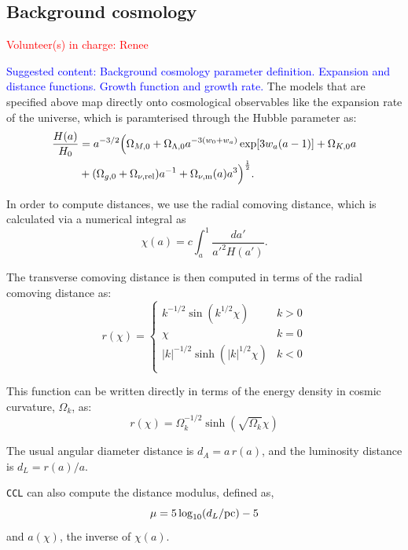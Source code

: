 \documentclass[\docopts]{\docclass}
\newcommand{\vol}[1]{\textcolor{red}{Volunteer(s) in charge: #1}}
\newcommand{\cont}[1]{\textcolor{blue}{Suggested content: #1}}
\newcommand{\ccl}{{\tt CCL}\xspace}
\begin{document}
\subsection{Background cosmology}
\vol{Renee}

\cont{Background cosmology parameter definition. Expansion and distance functions. Growth function and growth rate.}
The models that are specified above map directly onto cosmological observables like the expansion rate of the universe, which is paramterised through the Hubble parameter as:
\begin{align}\label{eq:Ha}
\frac{H(a)}{H_0} &= a^{-3/2}\Big(\Omega_{M,0}+\Omega_{\Lambda,0} a^{-3(w_0+w_a)}
    \exp[3 w_a (a-1)]+\Omega_{K,0} a \nonumber \\ &+(\Omega_{g,0} + \Omega_{\nu, {\rm rel}}) a^{-1} + \Omega_{\nu, {\rm m}}(a)a^3\Big)^{\frac{1}{2}}.
\end{align}

In order to compute distances, we use the radial comoving distance, which is calculated via a numerical integral as
\begin{equation}
 \chi(a)= c \int_a^1 \frac{da'}{a'^2 H(a')}.
\end{equation}

The transverse comoving distance is then computed in terms of the radial comoving distance as:
\begin{equation}\label{eq:angdist}
 r(\chi)=\left\{\begin{array}{cc}
                 k^{-1/2}\sin(k^{1/2}\chi) & k>0\\
                 \chi & k=0\\
                 |k|^{-1/2}\sinh(|k|^{1/2}\chi) & k<0\\
                \end{array}\right.
\end{equation}

This function can be written directly in terms of the energy density in cosmic curvature, $\Omega_k$, as:
\begin{equation}\label{eq:angdist_omegak}
 r(\chi)=                 \Omega_k^{-1/2}\sinh(\sqrt{\Omega_k}\chi)         
\end{equation}


The usual angular diameter distance is $d_A=a\,r(a)$, and the luminosity distance is
$d_L=r(a)/a$.

\ccl can also compute the distance modulus, defined as,
\begin{equation}\label{eq:distmod}
    \mu = 5 \log_{10}(d_L / {\rm pc})-5
\end{equation}
and $a(\chi)$, the inverse of $\chi(a)$.
\end{document}
